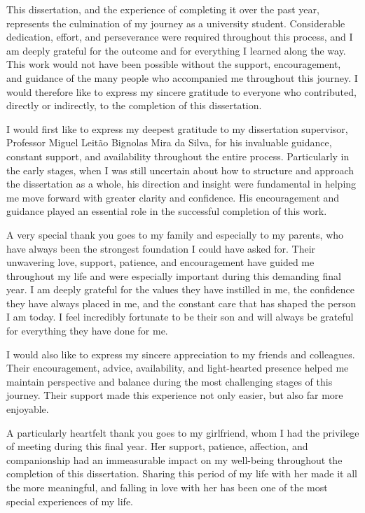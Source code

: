 
This dissertation, and the experience of completing it over the past year, represents the culmination of my journey as a university student. Considerable dedication, effort, and perseverance were required throughout this process, and I am deeply grateful for the outcome and for everything I learned along the way. This work would not have been possible without the support, encouragement, and guidance of the many people who accompanied me throughout this journey. I would therefore like to express my sincere gratitude to everyone who contributed, directly or indirectly, to the completion of this dissertation.

I would first like to express my deepest gratitude to my dissertation supervisor, Professor Miguel Leitão Bignolas Mira da Silva, for his invaluable guidance, constant support, and availability throughout the entire process. Particularly in the early stages, when I was still uncertain about how to structure and approach the dissertation as a whole, his direction and insight were fundamental in helping me move forward with greater clarity and confidence. His encouragement and guidance played an essential role in the successful completion of this work.

A very special thank you goes to my family and especially to my parents, who have always been the strongest foundation I could have asked for. Their unwavering love, support, patience, and encouragement have guided me throughout my life and were especially important during this demanding final year. I am deeply grateful for the values they have instilled in me, the confidence they have always placed in me, and the constant care that has shaped the person I am today. I feel incredibly fortunate to be their son and will always be grateful for everything they have done for me.

I would also like to express my sincere appreciation to my friends and colleagues. Their encouragement, advice, availability, and light-hearted presence helped me maintain perspective and balance during the most challenging stages of this journey. Their support made this experience not only easier, but also far more enjoyable.

A particularly heartfelt thank you goes to my girlfriend, whom I had the privilege of meeting during this final year. Her support, patience, affection, and companionship had an immeasurable impact on my well-being throughout the completion of this dissertation. Sharing this period of my life with her made it all the more meaningful, and falling in love with her has been one of the most special experiences of my life.

